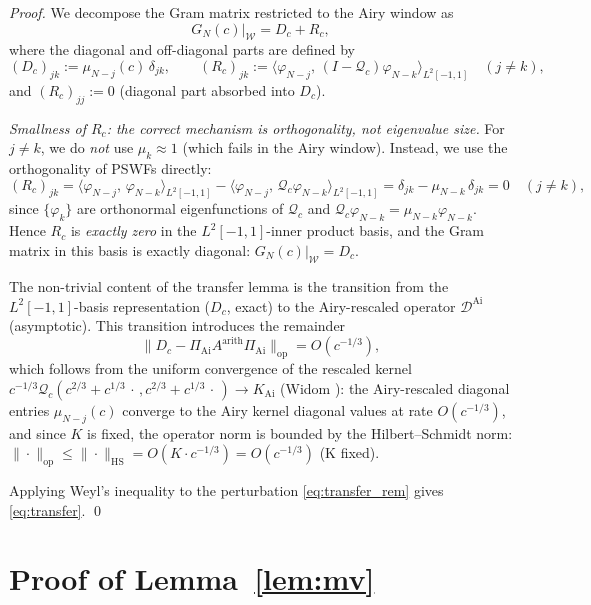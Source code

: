 \documentclass[12pt,a4paper]{amsart}
\theoremstyle{definition}
\newcommand{\DAi}{\mathcal{D}^{\mathrm{Ai}}}
\newcommand{\PAi}{\Pi_{\mathrm{Ai}}}
\newcommand{\GN}{G_N(c)}
\newcommand{\norm}[1]{\|#1\|}
\newcommand{\ip}[2]{\langle #1,\, #2 \rangle}
\begin{document}
\begin{proof}
We decompose the Gram matrix restricted to the Airy window as
\begin{equation}\label{eq:gram_decomp}
  \GN|_{\mathcal{W}} = D_c + R_c,
\end{equation}
where the diagonal and off-diagonal parts are defined by
\[
  (D_c)_{jk} := \mu_{N-j}(c)\,\delta_{jk},
  \qquad
  (R_c)_{jk} := \ip{\varphi_{N-j}}{(I - \mathcal{Q}_c)\varphi_{N-k}}_{L^2[-1,1]}
  \quad (j \neq k),
\]
and $(R_c)_{jj} := 0$ (diagonal part absorbed into $D_c$).

\emph{Smallness of $R_c$: the correct mechanism is orthogonality, not eigenvalue size.}
For $j \neq k$, we do \emph{not} use $\mu_k \approx 1$ (which fails in the
Airy window). Instead, we use the orthogonality of PSWFs directly:
\[
  (R_c)_{jk}
  = \ip{\varphi_{N-j}}{\varphi_{N-k}}_{L^2[-1,1]}
  - \ip{\varphi_{N-j}}{\mathcal{Q}_c\varphi_{N-k}}_{L^2[-1,1]}
  = \delta_{jk} - \mu_{N-k}\,\delta_{jk}
  = 0 \quad (j \neq k),
\]
since $\{\varphi_k\}$ are orthonormal eigenfunctions of $\mathcal{Q}_c$
and $\mathcal{Q}_c\varphi_{N-k} = \mu_{N-k}\varphi_{N-k}$.
Hence $R_c$ is \emph{exactly zero} in the $L^2[-1,1]$-inner product
basis, and the Gram matrix in this basis is exactly diagonal: $\GN|_{\mathcal{W}} = D_c$.

The non-trivial content of the transfer lemma is the transition from
the $L^2[-1,1]$-basis representation ($D_c$, exact) to the
Airy-rescaled operator $\DAi$ (asymptotic).
This transition introduces the remainder
\begin{equation}\label{eq:transfer_rem}
  \norm{D_c - \PAi A^{\mathrm{arith}}\PAi}_{\mathrm{op}}
  = O(c^{-1/3}),
\end{equation}
which follows from the uniform convergence of the rescaled kernel
$c^{-1/3}\mathcal{Q}_c(c^{2/3} + c^{1/3}\,\cdot\,, c^{2/3} + c^{1/3}\,\cdot\,)
\to K_{\mathrm{Ai}}$ (Widom \cite{Widom1964}): the Airy-rescaled diagonal
entries $\mu_{N-j}(c)$ converge to the Airy kernel diagonal values at
rate $O(c^{-1/3})$, and since $K$ is fixed, the operator norm is bounded
by the Hilbert--Schmidt norm:
$\norm{\cdot}_{\mathrm{op}} \le \norm{\cdot}_{\mathrm{HS}} = O(K \cdot c^{-1/3}) = O(c^{-1/3})$
(K fixed).

Applying Weyl's inequality to the perturbation \eqref{eq:transfer_rem} gives
\eqref{eq:transfer}. \qed
\end{proof}

\section{Proof of Lemma~\ref{lem:mv}}\label{app:mv}
\end{document}
